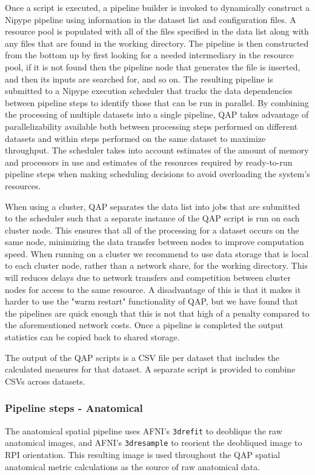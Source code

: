 \documentclass{frontiersSCNS} %
\begin{document}
Once a script is executed, a pipeline builder is invoked to dynamically construct a Nipype pipeline using information in the dataset list and configuration files. A resource pool is populated with all of the files specified in the data list along with any files that are found in the working directory. The pipeline is then constructed from the bottom up by first looking for a needed intermediary in the resource pool, if it is not found then the pipeline node that generates the file is inserted, and then its inputs are searched for, and so on. The resulting pipeline is submitted to a Nipype execution scheduler that tracks the data dependencies between pipeline steps to identify those that can be run in parallel. By combining the processing of multiple datasets into a single pipeline, QAP takes advantage of parallelizability available both between processing steps performed on different datasets and within steps performed on the same dataset to maximize throughput. The scheduler takes into account estimates of the amount of memory and processors in use and estimates of the resources required by ready-to-run pipeline steps when making scheduling decisions to avoid overloading the system's resources.

When using a cluster, QAP separates the data list into jobs that are submitted to the scheduler such that a separate instance of the QAP script is run on each cluster node. This ensures that all of the processing for a dataset occurs on the same node, minimizing the data transfer between nodes to improve computation speed. When running on a cluster we recommend to use data storage that is local to each cluster node, rather than a network share, for the working directory. This will reduces delays due to network transfers and competition between cluster nodes for access to the same resource. A disadvantage of this is that it makes it harder to use the "warm restart" functionality of QAP, but we have found that the pipelines are quick enough that this is not that high of a penalty compared to the aforementioned network costs. Once a pipeline is completed the output statistics can be copied back to shared storage.

The output of the QAP scripts is a CSV file per dataset that includes the calculated measures for that dataset. A separate script is provided to combine  CSVs across datasets. 

\subsubsection{Pipeline steps - Anatomical}
\label{sec:21}
The anatomical spatial pipeline uses AFNI's \texttt{3drefit} to deoblique the raw anatomical images, and AFNI's \texttt{3dresample} to reorient the deobliqued image to RPI orientation. This resulting image is used throughout the QAP spatial anatomical metric calculations as the source of raw anatomical data.
\end{document}

